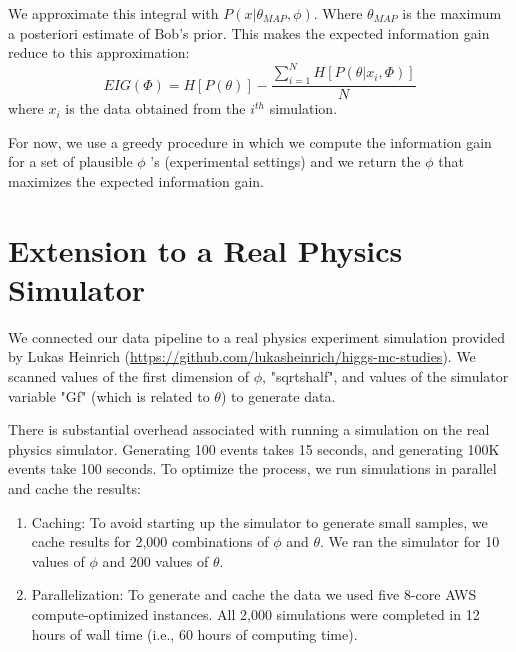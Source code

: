 \documentclass[10pt,journal,compsoc]{IEEEtran}
\begin{document}
We approximate this integral with $P(x | \theta_{MAP}, \phi)$. Where $\theta_{MAP}$ is the maximum a posteriori estimate of Bob's prior. This makes the expected information gain reduce to this approximation:
\begin{equation}\label{infGain}
EIG(\Phi) = H[P(\theta)] - \frac{\sum_{i=1}^NH[P(\theta|x_i,\Phi)]}{N}
\end{equation}
where $x_i$ is the data obtained from the $i^{th}$ simulation.

For now, we use a greedy procedure in which we compute the information gain for a set of plausible $\phi$ 's (experimental settings) and we return the $\phi$ that maximizes the expected information gain.

\section{Extension to a Real Physics Simulator}
We connected our data pipeline to a real physics experiment simulation provided by Lukas Heinrich (\url{https://github.com/lukasheinrich/higgs-mc-studies}). We scanned values of the first dimension of $\phi$, "sqrtshalf", and values of the simulator variable "Gf" (which is related to $\theta$) to generate data.

There is substantial overhead associated with running a simulation on the real physics simulator. Generating 100 events takes 15 seconds, and generating 100K events take 100 seconds. To optimize the process, we run simulations in parallel and cache the results:

\begin{enumerate}
\item Caching:  To avoid starting up the simulator to generate small samples, we cache results for 2,000 combinations of $\phi$ and $\theta$. We ran the simulator for 10 values of $\phi$ and 200 values of $\theta$.
\item Parallelization: To generate and cache the data we used five 8-core AWS compute-optimized instances. All 2,000 simulations were completed in 12 hours of wall time (i.e., 60 hours of computing time). 
\end{enumerate}

%
%
\end{document}

